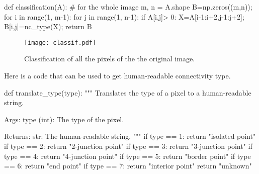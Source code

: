\begin{python}
def classification(A):
     # for the whole image
    m, n = A.shape
    B=np.zeros((m,n));
    for i in range(1, m-1):
        for j in range(1, n-1):
            if A[i,j]> 0:
                X=A[i-1:i+2,j-1:j+2];
                B[i,j]=nc_type(X);
    return B
\end{python}

\begin{figure}[htbp]
\centering
\texttt{[image: classif.pdf]}
\caption{Classification of all the pixels of the the original image.}
\label{fig:topological_description:python:classification}
\end{figure}


Here is a code that can be used to get human-readable connectivity type.

\begin{python}
def translate_type(type):
    """
    Translates the type of a pixel to a human-readable string.

    Args:
        type (int): The type of the pixel.

    Returns:
        str: The human-readable string.
    """
    if type == 1:
        return "isolated point"
    if type == 2:
        return "2-junction point"
    if type == 3:
        return "3-junction point"
    if type == 4:
        return "4-junction point"
    if type == 5:
        return "border point"
    if type == 6:
        return "end point"
    if type == 7:
        return "interior point"
    return "unknown"
\end{python}

